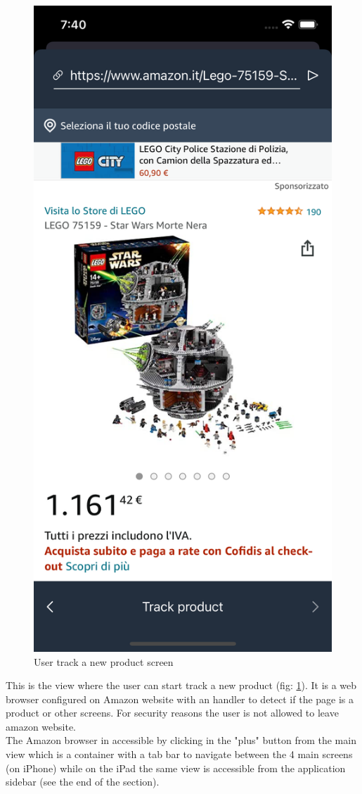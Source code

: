 \begin{figure}[h!]
        \centering
        \includegraphics[scale=0.15]{images/interfaces/tracking_product_screen.png}
        \caption{User track a new product screen}
        \label{fig:tracking_product_screen}
\end{figure}
\FloatBarrier
This is the view where the user can start track a new product (fig: \ref{fig:tracking_product_screen}). It is a web browser configured on Amazon website with an handler to detect if the page is a product or other screens. For security reasons the user is not allowed to leave amazon website.\\
The Amazon browser in accessible by clicking in the "plus" button from the main view which is a container with a tab bar to navigate between the 4 main screens (on iPhone) while on the iPad the same view is accessible from the application sidebar (see the end of the section).

